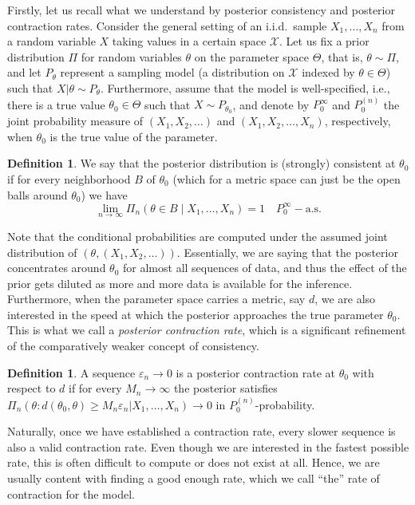 \documentclass{article}
\numberwithin{equation}{section}
\theoremstyle{plain}
\theoremstyle{definition}
\newtheorem{definition}[theorem]{Definition}
\renewcommand{\epsilon}{\varepsilon}
\begin{document}
Firstly, let us recall what we understand by posterior consistency and posterior contraction rates. Consider the general setting of an i.i.d.\ sample \(X_1,\dots, X_n\) from a random variable \(X\) taking values in a certain space \(\mathcal X\). Let us fix a prior distribution \(\Pi\) for random variables \(\theta\) on the parameter space \(\Theta\), that is, \(\theta \sim \Pi\), and let \(P_\theta\) represent a sampling model (a distribution on \(\mathcal X\) indexed by \(\theta \in \Theta\)) such that \(X | \theta \sim P_{\theta}\). Furthermore, assume that the model is well-specified, i.e., there is a true value \(\theta_{0}\in\Theta\) such that \(X \sim P_{\theta_0}\), and denote by \(P_0^\infty\) and \(P_0^{(n)}\) the joint probability measure of \((X_1, X_2, \dots)\) and \((X_1, X_2, \dots, X_n)\), respectively, when \(\theta_0\) is the true value of the parameter.

\begin{definition}
We say that the posterior distribution is (strongly) consistent at \(\theta_0\) if for every neighborhood \(B\) of \(\theta_0\) (which for a metric space can just be the open balls around \(\theta_0\)) we have
  \[
    \lim_{n\to\infty} \Pi_n(\theta \in B \mid X_1, \dots, X_n) = 1 \quad P_0^\infty-\text{a.s.}
  \]
\end{definition}

Note that the conditional probabilities are computed under the assumed joint distribution of \((\theta, (X_1, X_2,\dots))\). Essentially, we are saying that the posterior concentrates around \(\theta_0\) for almost all sequences of data, and thus the effect of the prior gets diluted as more and more data is available for the inference. Furthermore, when the parameter space carries a metric, say \(d\), we are also interested in the speed at which the posterior approaches the true parameter \(\theta_0\). This is what we call a \textit{posterior contraction rate}, which is a significant refinement of the comparatively weaker concept of consistency.

\begin{definition}
  A sequence \(\epsilon_n\to 0\) is a posterior contraction rate at \(\theta_0\) with respect to \(d\) if for every \(M_n\to\infty\) the posterior satisfies \(\Pi_n(\theta: d(\theta_0, \theta) \geq M_n \epsilon_n | X_1,\dots, X_n) \to 0\) in \(P_0^{(n)}\)-probability.
\end{definition}

Naturally, once we have established a contraction rate, every slower sequence is also a valid contraction rate. Even though we are interested in the fastest possible rate, this is often difficult to compute or does not exist at all. Hence, we are usually content with finding a good enough rate, which we call ``the'' rate of contraction for the model.
\end{document}
